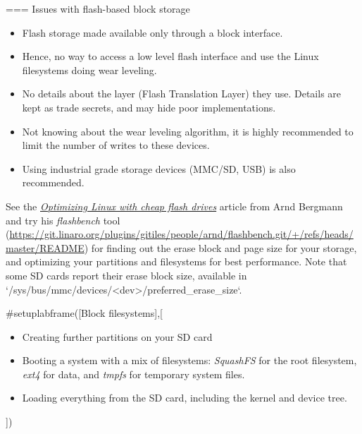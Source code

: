 === Issues with flash-based block storage
  \begin{itemize}
  \item Flash storage made available only through a block interface.
  \item Hence, no way to access a low level flash interface
    and use the Linux filesystems doing wear leveling.
  \item No details about the layer (Flash Translation Layer) they
    use. Details are kept as trade secrets, and may hide poor
    implementations.
  \item Not knowing about the wear leveling algorithm, it is highly
    recommended to limit the number of writes to these devices.
  \item Using industrial grade storage devices (MMC/SD, USB) is
    also recommended.
  \end{itemize}
  See the \href{https://lwn.net/Articles/428584/}{\em Optimizing Linux with
  cheap flash drives} article from Arnd Bergmann and try his {\em
  flashbench} tool (\url{https://git.linaro.org/plugins/gitiles/people/arnd/flashbench.git/+/refs/heads/master/README})
  for finding out the erase block and page size for your storage, and
  optimizing your partitions and filesystems for best performance.
  Note that some SD cards report their erase block size, available in
  `/sys/bus/mmc/devices/<dev>/preferred_erase_size`.


#setuplabframe([Block filesystems],[
  \begin{itemize}
  \item Creating further partitions on your SD card
  \item Booting a system with a mix of filesystems: {\em SquashFS} for
    the root filesystem, {\em ext4} for data, and {\em
    tmpfs} for temporary system files.
  \item Loading everything from the SD card, including
    the kernel and device tree.
  \end{itemize}
])
